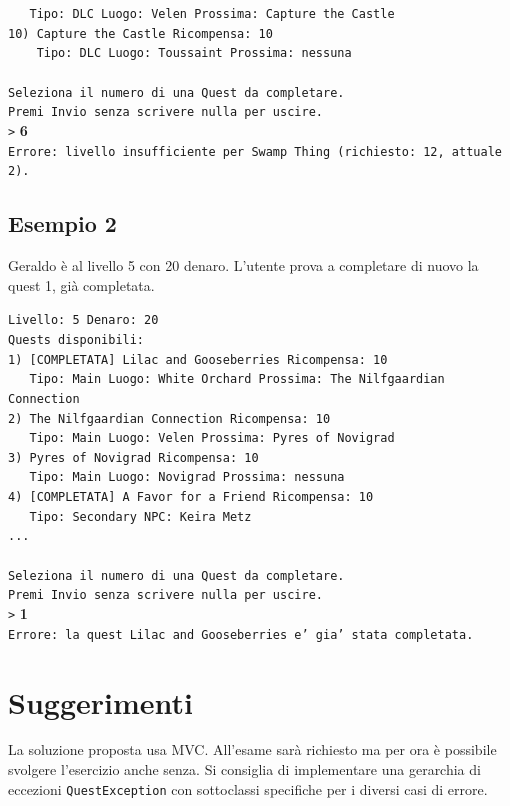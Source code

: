 \documentclass[a4paper,12pt]{article}
\begin{document}
\begin{tcolorbox}[colback=gray!5, colframe=gray!50]
\texttt{\ \ \ Tipo: DLC Luogo: Velen Prossima: Capture the Castle} \\
\texttt{10) Capture the Castle Ricompensa: 10} \\
\texttt{\ \ \ \ Tipo: DLC  Luogo: Toussaint Prossima: nessuna} \\
\\
\texttt{Seleziona il numero di una Quest da completare.} \\
\texttt{Premi Invio senza scrivere nulla per uscire.} \\
\texttt{>} \textbf{6} \\
\texttt{Errore: livello insufficiente per Swamp Thing (richiesto: 12, attuale 2).}
\end{tcolorbox}

\newpage

\subsection*{Esempio 2}
Geraldo è al livello 5 con 20 denaro. L'utente prova a completare di nuovo la quest 1, già completata.

\begin{tcolorbox}[colback=gray!5, colframe=gray!50]
\texttt{Livello: 5 Denaro: 20} \\
\texttt{Quests disponibili:} \\
\texttt{1) [COMPLETATA] Lilac and Gooseberries Ricompensa: 10} \\
\texttt{\ \ \ Tipo: Main Luogo: White Orchard Prossima: The Nilfgaardian Connection} \\
\texttt{2) The Nilfgaardian Connection Ricompensa: 10} \\
\texttt{\ \ \ Tipo: Main Luogo: Velen Prossima: Pyres of Novigrad} \\
\texttt{3) Pyres of Novigrad Ricompensa: 10} \\
\texttt{\ \ \ Tipo: Main Luogo: Novigrad Prossima: nessuna} \\
\texttt{4) [COMPLETATA] A Favor for a Friend Ricompensa: 10} \\
\texttt{\ \ \ Tipo: Secondary NPC: Keira Metz} \\
\texttt{...} \\
\\
\texttt{Seleziona il numero di una Quest da completare.} \\
\texttt{Premi Invio senza scrivere nulla per uscire.} \\
\texttt{>} \textbf{1} \\
\texttt{Errore: la quest Lilac and Gooseberries e' gia' stata completata.}
\end{tcolorbox}

\section{Suggerimenti}
La soluzione proposta usa MVC. All'esame sarà richiesto ma per ora è possibile svolgere l'esercizio anche senza.
\newline
Si consiglia di implementare una gerarchia di eccezioni \texttt{QuestException} con sottoclassi specifiche per i diversi casi di errore.
\end{document}
